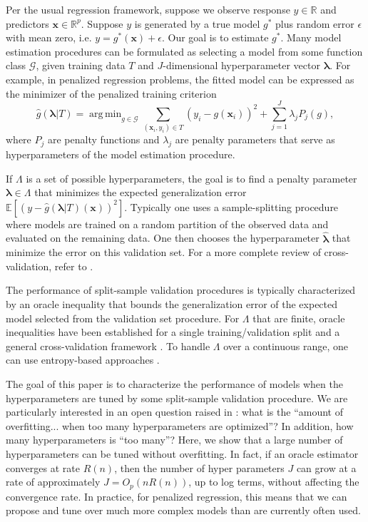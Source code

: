 \documentclass[12pt]{article} %
\theoremstyle{definition}
\DeclareMathOperator*{\argmin}{arg\,min}
\begin{document}
Per the usual regression framework, suppose we observe response $y \in \mathbb{R}$ and predictors $\boldsymbol {x} \in \mathbb{R}^p$. Suppose $y$ is generated by a true model $g^*$ plus random error $\epsilon$ with mean zero, i.e.
$y = g^*(\boldsymbol x) + \epsilon$.
Our goal is to estimate $g^*$.
Many model estimation procedures can be formulated as selecting a model from some function class $\mathcal{G}$, given training data $T$ and $J$-dimensional hyperparameter vector $\boldsymbol{\lambda}$. For example, in penalized regression problems, the fitted model can be expressed as the minimizer of the penalized training criterion
\begin{equation}
\label{eq:intro_pen_reg}
\hat{g}(\boldsymbol \lambda | T) = \argmin_{g\in \mathcal{G}} \sum_{(\boldsymbol{x}_i, y_i) \in T} \left (y_i -  g(\boldsymbol{x}_i) \right )^2 + \sum_{j=1}^J \lambda_j P_j(g),
\end{equation}
where $P_j$ are penalty functions and $\lambda_j$ are penalty parameters that serve as hyperparameters of the model estimation procedure.

If $\Lambda$ is a set of possible hyperparameters, the goal is to find a penalty parameter $\boldsymbol{\lambda} \in \Lambda$ that minimizes the expected generalization error
$
\mathbb{E} \left [
\left ( y - \hat{g}(\boldsymbol{\lambda} | T)(\boldsymbol{x}) \right )^2
\right ].
$
Typically one uses a sample-splitting procedure where models are trained on a random partition of the observed data and evaluated on the remaining data.
One then chooses the hyperparameter $\hat{\boldsymbol{\lambda}}$ that minimize the error on this validation set.
For a more complete review of cross-validation, refer to \citet{arlot2010survey}.

The performance of split-sample validation procedures is typically characterized by an oracle inequality that bounds the generalization error of the expected model selected from the validation set procedure. For $\Lambda$ that are finite, oracle inequalities have been established for a single training/validation split \citep[Chap. 7]{gyorfi2002distribution} and a general cross-validation framework \citep*{Van_der_Laan2003-ei, Van_der_Laan2004-bp}. To handle $\Lambda$ over a continuous range, one can use entropy-based approaches \citep{lecue2012oracle}.

The goal of this paper is to characterize the performance of models when the hyperparameters are tuned by some split-sample validation procedure. We are particularly interested in an open question raised in \citet{bengio2000gradient}: what is the ``amount of overfitting... when too many hyperparameters are optimized''? In addition, how many hyperparameters is ``too many''? Here, we show that a large number of hyperparameters can be tuned without overfitting. In fact, if an oracle estimator converges at rate $R(n)$, then the number of hyper parameters $J$ can grow at a rate of approximately $J = O_p(nR(n))$, up to log terms, without affecting the convergence rate. In practice, for penalized regression, this means that we can propose and tune over much more complex models than are currently often used.
\end{document}
